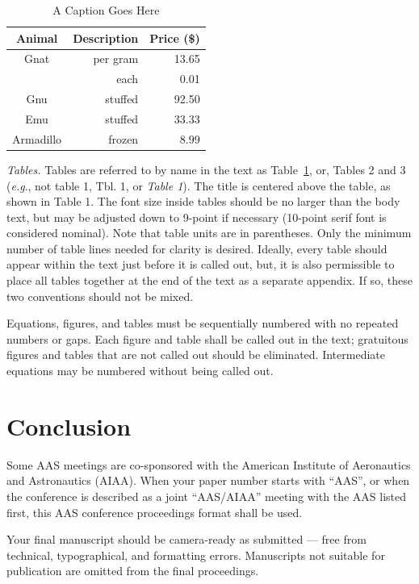 \documentclass[letterpaper, preprint, paper,11pt]{AAS}	%
\begin{document}
\begin{table}[htbp]
	\fontsize{10}{10}\selectfont
    \caption{A Caption Goes Here}
   \label{tab:label}
        \centering 
   \begin{tabular}{c | r | r } %
      \hline 
      Animal    & Description & Price (\$)\\
      \hline 
      Gnat      & per gram & 13.65 \\
                & each     &  0.01 \\
      Gnu       & stuffed  & 92.50 \\
      Emu       & stuffed  & 33.33 \\
      Armadillo & frozen   &  8.99 \\
      \hline
   \end{tabular}
\end{table}

\emph{Tables.} 
Tables are referred to by name in the text as Table~\ref{tab:label}, or, Tables 2 and 3 (\emph{e.g}., not table 1, Tbl. 1, or \emph{Table 1}). The title is centered above the table, as shown in Table 1. The font size inside tables should be no larger than the body text, but may be adjusted down to 9-point if necessary (10-point serif font is considered nominal). Note that table units are in parentheses. Only the minimum number of table lines needed for clarity is desired. Ideally, every table should appear within the text just before it is called out, but, it is also permissible to place all tables together at the end of the text as a separate appendix. If so, these two conventions should not be mixed.

Equations, figures, and tables must be sequentially numbered with no repeated numbers or gaps. Each figure and table shall be called out in the text; gratuitous figures and tables that are not called out should be eliminated. Intermediate equations may be numbered without being called out.



\section{Conclusion}
Some AAS meetings are co-sponsored with the American Institute of Aeronautics and Astronautics (AIAA). When your paper number starts with ``AAS'', or when the conference is described as a joint ``AAS/AIAA'' meeting with the AAS listed first, this AAS conference proceedings format shall be used.

Your final manuscript should be camera-ready as submitted --- free from technical, typographical, and formatting errors. Manuscripts not suitable for publication are omitted from the final proceedings.
\end{document}
